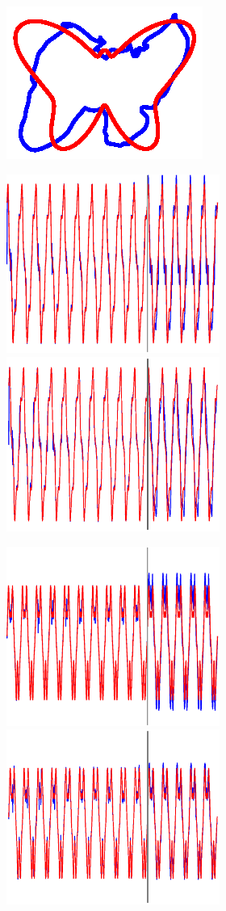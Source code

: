 \begin{figure}
\begin{subfigure}{\textwidth}
\begin{subfigure}{\textwidth}
        \hspace{4em}
        \includegraphics[trim=6cm 4.5cm 6cm 4.5cm, clip=true,height=.1\textheight]{Figures/Fig_T1/Python/RHML_T1_Trajectory}
        
        \end{subfigure}
         
        
        
        \textbf{}\begin{subfigure}{\textwidth}
        \centering
        
        \includegraphics[height=0.08\linewidth,width=.45\linewidth]{Figures/Fig_T1/MATLAB/RHML_T1_CoordinateX}
        \includegraphics[trim=2cm 1cm 2cm 1cm, clip=true,height=0.08\linewidth,width=.45\linewidth]{Figures/Fig_T1/Python/RHML_T1_CoordinateX}
        
        \end{subfigure}
         
        
        
        \textbf{}\begin{subfigure}{\textwidth}
        \centering
        
        \includegraphics[height=0.08\linewidth,width=.45\linewidth]{Figures/Fig_T1/MATLAB/RHML_T1_CoordinateY}
        \includegraphics[trim=2cm 1cm 2cm 1cm, clip=true,height=0.08\linewidth,width=.45\linewidth]{Figures/Fig_T1/Python/RHML_T1_CoordinateY}
        

\end{subfigure}
\end{subfigure}
\end{figure}
